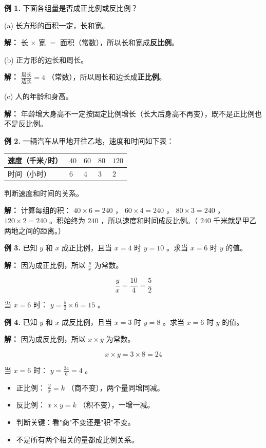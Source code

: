 \begin{workedexamples}


\textbf{例 1.} 下面各组量是否成正比例或反比例？

(a) 长方形的面积一定，长和宽。

\textbf{解：} 长 $\times$ 宽 $=$ 面积（常数），所以长和宽成\textbf{反比例}。

(b) 正方形的边长和周长。

\textbf{解：} $\frac{\text{周长}}{\text{边长}} = 4$ （常数），所以周长和边长成\textbf{正比例}。

(c) 人的年龄和身高。

\textbf{解：} 年龄增大身高不一定按固定比例增长（长大后身高不再变），既不是正比例也不是反比例。

\textbf{例 2.} 一辆汽车从甲地开往乙地，速度和时间如下表：

\begin{center}
\begin{tabular}{lllll}
\toprule
速度（千米/时） & $40$ & $60$ & $80$ & $120$ \\
\midrule
时间（小时） & $6$ & $4$ & $3$ & $2$ \\
\bottomrule
\end{tabular}
\end{center}


判断速度和时间的关系。

\textbf{解：} 计算每组的积： $40 \times 6 = 240$ ， $60 \times 4 = 240$ ， $80 \times 3 = 240$ ， $120 \times 2 = 240$ 。积始终为 $240$ ，所以速度和时间成反比例。（ $240$ 千米就是甲乙两地之间的距离。）

\textbf{例 3.} 已知 $y$ 和 $x$ 成正比例，且当 $x = 4$ 时 $y = 10$ 。求当 $x = 6$ 时 $y$ 的值。

\textbf{解：} 因为成正比例，所以 $\frac{y}{x}$ 为常数。

\[
\frac{y}{x} = \frac{10}{4} = \frac{5}{2}
\]


当 $x = 6$ 时： $y = \frac{5}{2} \times 6 = 15$ 。

\textbf{例 4.} 已知 $y$ 和 $x$ 成反比例，且当 $x = 3$ 时 $y = 8$ 。求当 $x = 6$ 时 $y$ 的值。

\textbf{解：} 因为成反比例，所以 $x \times y$ 为常数。

\[
x \times y = 3 \times 8 = 24
\]


当 $x = 6$ 时： $y = \frac{24}{6} = 4$ 。

\end{workedexamples}

\begin{keytakeaway}


\begin{itemize}
  \item 正比例： $\frac{y}{x} = k$ （商不变），两个量同增同减。
  \item 反比例： $x \times y = k$ （积不变），一增一减。
  \item 判断关键：看"商"不变还是"积"不变。
  \item 不是所有两个相关的量都成比例关系。
\end{itemize}


\end{keytakeaway}

